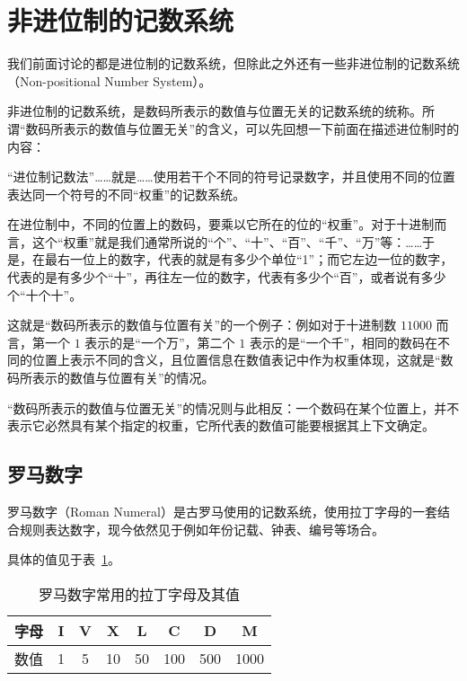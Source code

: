 \section{非进位制的记数系统}\label{sec:NumberSystemBasics/NonPositional}
    我们前面讨论的都是进位制的记数系统，但除此之外还有一些非进位制的记数系统（Non-positional Number System）。

    非进位制的记数系统，是数码所表示的数值与位置无关的记数系统的统称。所谓“数码所表示的数值与位置无关”的含义，可以先回想一下前面在描述进位制时的内容：

    \begin{displayquote}
        “进位制记数法”……就是……使用若干个不同的符号记录数字，并且使用不同的位置表达同一个符号的不同“权重”的记数系统。

        在进位制中，不同的位置上的数码，要乘以它所在的位的“权重”。对于十进制而言，这个“权重”就是我们通常所说的“个”、“十”、“百”、“千”、“万”等：……于是，在最右一位上的数字，代表的就是有多少个单位“1”；而它左边一位的数字，代表的是有多少个“十”，再往左一位的数字，代表有多少个“百”，或者说有多少个“十个十”。
    \end{displayquote}

    这就是“数码所表示的数值与位置有关”的一个例子：例如对于十进制数 $11000$ 而言，第一个 $1$ 表示的是“一个万”，第二个 $1$ 表示的是“一个千”，相同的数码在不同的位置上表示不同的含义，且位置信息在数值表记中作为权重体现，这就是“数码所表示的数值与位置有关”的情况。

    “数码所表示的数值与位置无关”的情况则与此相反：一个数码在某个位置上，并不表示它必然具有某个指定的权重，它所代表的数值可能要根据其上下文确定。

    \subsection{罗马数字}\label{subsec:NumberSystemBasics/NonPositional/RomanNumeral}
        罗马数字（Roman Numeral）是古罗马使用的记数系统，使用拉丁字母的一套结合规则表达数字，现今依然见于例如年份记载、钟表、编号等场合。

        具体的值见于表~\ref{tab:NumberSystemBasics/NonPositional/RomanNumeral/Values}。

        \begin{table}
            \centering
            \begin{tabular}{|l|c|c|c|c|c|c|c|}
                \hline
                字母 & I & V &  X &  L &   C &   D &    M \\ \hline
                数值 & 1 & 5 & 10 & 50 & 100 & 500 & 1000 \\ \hline
            \end{tabular}
            \caption{罗马数字常用的拉丁字母及其值}
            \label{tab:NumberSystemBasics/NonPositional/RomanNumeral/Values}
        \end{table}

